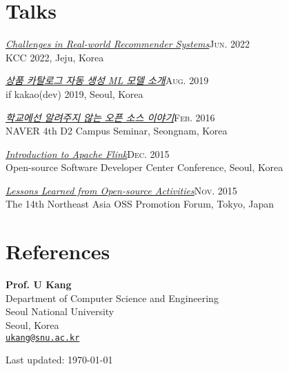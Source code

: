 \documentclass[11pt,a4paper]{article}
\renewenvironment{itemize}{
  \begin{list}{}{
    \setlength{\leftmargin}{1.5em}
    \setlength{\itemsep}{0.5em}
    \setlength{\parskip}{0pt}
    \setlength{\parsep}{0.25em}
  }
}{
  \end{list}
}
\begin{document}
\section*{Talks}
\begin{itemize}
  \item \href{https://speakerdeck.com/chiwanpark/challenges-in-real-world-recommender-systems}{\textit{Challenges in Real-world Recommender Systems}}\hfill\textsc{Jun. 2022}\\
        KCC 2022, Jeju, Korea
  \item \href{http://bit.ly/chiwanpark-ifkakao2019-new}{\textit{상품 카탈로그 자동 생성 ML 모델 소개}}\hfill\textsc{Aug. 2019}\\
        if kakao(dev) 2019, Seoul, Korea
  \item \href{http://j.mp/d2-campus-seminar-4th-park}{\textit{학교에선 알려주지 않는 오픈 소스 이야기}}\hfill\textsc{Feb. 2016}\\
        NAVER 4th D2 Campus Seminar, Seongnam, Korea
  \item \href{http://j.mp/ossdevconf-2015-park}{\textit{Introduction to Apache Flink}}\hfill\textsc{Dec. 2015}\\
        Open-source Software Developer Center Conference, Seoul, Korea
  \item \href{http://j.mp/cjkossforum-2015-park}{\textit{Lessons Learned from Open-source Activities}}\hfill\textsc{Nov. 2015}\\
        The 14th Northeast Asia OSS Promotion Forum, Tokyo, Japan
\end{itemize}

\section*{References}
\begin{itemize}
  \item \textbf{Prof. U Kang}\\
        Department of Computer Science and Engineering\\
        Seoul National University\\
        Seoul, Korea\\
        \href{mailto:ukang@snu.ac.kr}{\texttt{ukang@snu.ac.kr}}
\end{itemize}

\bigskip
{\small Last updated: \today}
\end{document}
